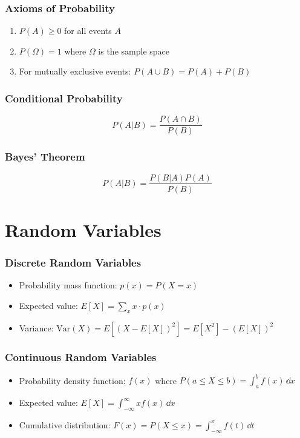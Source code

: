 \subsubsection{Axioms of Probability}
\begin{enumerate}
    \item $P(A) \geq 0$ for all events $A$
    \item $P(\Omega) = 1$ where $\Omega$ is the sample space
    \item For mutually exclusive events: $P(A \cup B) = P(A) + P(B)$
\end{enumerate}

\subsubsection{Conditional Probability}
\begin{equation}
P(A|B) = \frac{P(A \cap B)}{P(B)}
\end{equation}

\subsubsection{Bayes' Theorem}
\begin{equation}
P(A|B) = \frac{P(B|A)P(A)}{P(B)}
\end{equation}

\section{Random Variables}

\subsubsection{Discrete Random Variables}
\begin{itemize}
    \item Probability mass function: $p(x) = P(X = x)$
    \item Expected value: $E[X] = \sum_x x \cdot p(x)$
    \item Variance: $\text{Var}(X) = E[(X - E[X])^2] = E[X^2] - (E[X])^2$
\end{itemize}

\subsubsection{Continuous Random Variables}
\begin{itemize}
    \item Probability density function: $f(x)$ where $P(a \leq X \leq b) = \int_a^b f(x)\,\dd x$
    \item Expected value: $E[X] = \int_{-\infty}^{\infty} x f(x)\,\dd x$
    \item Cumulative distribution: $F(x) = P(X \leq x) = \int_{-\infty}^x f(t)\,\dd t$
\end{itemize}

